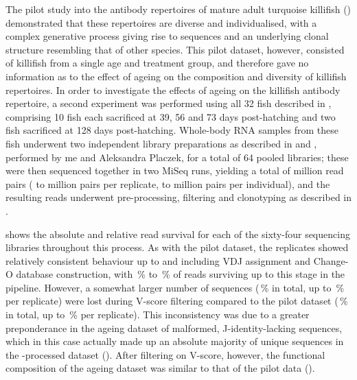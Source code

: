 The pilot study into the antibody repertoires of mature adult turquoise killifish () demonstrated that these repertoires are diverse and individualised, with a complex generative process giving rise to \naive sequences and an underlying clonal structure resembling that of other species. This pilot dataset, however, consisted of killifish from a single age and treatment group, and therefore gave no information as to the effect of ageing on the composition and diversity of killifish repertoires. In order to investigate the effects of ageing on the killifish antibody repertoire, a second \igseq experiment was performed using all 32 fish described in  , comprising 10 fish each sacrificed at 39, 56 and 73 days post-hatching and two fish sacrificed at 128 days post-hatching. Whole-body RNA samples from these fish underwent two independent library preparations as described in  and , performed by me and Aleksandra Placzek, for a total of 64 pooled libraries; these were then sequenced together in two MiSeq runs, yielding a total of  million read pairs ( to  million pairs per replicate,  to  million pairs per individual), and the resulting reads underwent pre-processing, filtering and clonotyping as described in .

 shows the absolute and relative read survival for each of the sixty-four sequencing libraries throughout this process. As with the pilot dataset, the replicates showed relatively consistent behaviour up to and including VDJ assignment and Change-O database construction, with \,\% to \,\% of reads surviving up to this stage in the pipeline. However, a somewhat larger number of sequences (\,\% in total, up to \,\% per replicate) were lost during V-score filtering compared to the pilot dataset (\,\% in total, up to \,\% per replicate). This inconsistency was due to a greater preponderance in the ageing dataset of malformed, J-identity-lacking sequences, which in this case actually made up an absolute majority of unique sequences in the -processed dataset (). After filtering on V-score, however, the functional composition of the ageing dataset was similar to that of the pilot data ().


